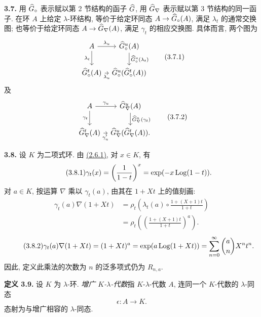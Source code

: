 \textbf{3.7.} 用 \(\widehat G_{\circ}\) 表示赋以第 2 节结构的函子 \(\widehat G\), 用 \(\widehat G_{\nabla}\) 表示赋以第 3 节结构的同一函子. 在环 \(A\) 上给定 \(\lambda\)-环结构, 等价于给定环同态 \(A\to\widehat G_{\circ}(A)\), 满足 \(\lambda_t\) 的通常交换图; 也等价于给定环同态 \(A\to\widehat G_{\nabla}(A)\), 满足 \(\gamma_t\) 的相应交换图. 具体而言, 两个图为
\[
\begin{tikzcd}[column sep=tiny]
A \arrow[r,"\lambda_u"] \arrow[d,"\lambda_t"'] & \Gcirc^u(A) \arrow[d,"\Gcirc^u(\lambda_t)"]\\
\Gcirc^t(A) \arrow[r,"\lambda_u"'] & \Gcirc^u(\Gcirc^t(A))
\end{tikzcd}
\tag{3.7.1}
\]
及
\[
\begin{tikzcd}[column sep=tiny]
A \arrow[r,"\gamma_u"] \arrow[d,"\gamma_t"'] & \Gnabla^u(A) \arrow[d,"\Gnabla^u(\gamma_t)"]\\
\Gnabla^t(A) \arrow[r,"\gamma'_u"'] & \Gnabla^u(\Gnabla^t(A)).
\end{tikzcd}
\tag{3.7.2}
\]

\textbf{3.8.} 设 \(K\) 为二项式环. 由 \hyperlink{sga6.e05.eq.2-6-1}{(2.6.1)}, 对 \(x\in K\), 有
\begin{equation}\tag{3.8.1}
  \gamma_t(x)=\left(\frac1{1-t}\right)^x
  =\exp(-x\operatorname{Log}(1-t)).
\end{equation}
对 \(a\in K\), 按运算 \(\nabla\) 乘以 \(\gamma_t(a)\), 由其在 \(1+Xt\) 上的值刻画:
\[
 \begin{aligned}
 \gamma_t(a)\nabla(1+Xt)
 &=\rho_t\!\left(\lambda_t(a)\circ
                 \frac{1+(X+1)t}{1+t}\right)\\
 &=\rho_t\!\left(\left(\frac{1+(X+1)t}{1+t}\right)^a\right).
 \end{aligned}
\]
\begin{equation}\tag{3.8.2}
  \gamma_t(a)\nabla(1+Xt)
  =(1+Xt)^a
  =\exp(a\operatorname{Log}(1+Xt))
  =\sum_{n=0}^{\infty}\binom{a}{n}X^nt^n .
\end{equation}
因此, 定义此乘法的次数为 \(n\) 的泛多项式仍为 \(R_{n,a}\).

\textbf{定义 3.9.} 设 \(K\) 为 \(\lambda\)-环. \emph{增广 \(K\)-\(\lambda\)-代数}指 \(K\)-\(\lambda\)-代数 \(A\), 连同一个 \(K\)-代数的 \(\lambda\)-同态
\[
  \epsilon:A\longrightarrow K.
\]
态射为与增广相容的 \(\lambda\)-同态.

